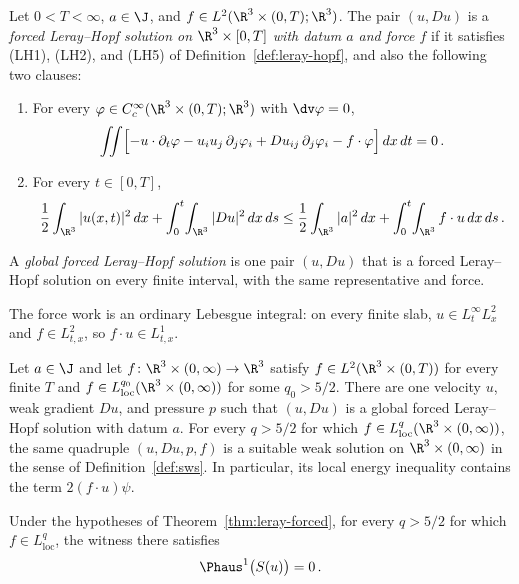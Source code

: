 \documentclass[11pt,reqno]{amsart}
\begin{document}
\begin{definition}\label{def:forced-leray-hopf}
Let $0<T<\infty$, $a\in\J$, and
$f\in L^2(\R^3\times(0,T);\R^3)$. The pair $(u,Du)$ is a
\emph{forced Leray--Hopf solution on $\R^3\times[0,T]$ with datum $a$ and
force $f$} if it satisfies (LH1), (LH2), and (LH5) of
Definition~\ref{def:leray-hopf}, and also the following two clauses:
\begin{enumerate}[label=(FLH\arabic*)]
\item For every $\varphi\in C_c^\infty(\R^3\times(0,T);\R^3)$ with
  $\dv\varphi=0$,
  \[
  \iint\Bigl[-u\cdot\partial_t\varphi-u_i u_j\,\partial_j\varphi_i
       +Du_{ij}\,\partial_j\varphi_i-f\cdot\varphi\Bigr]\,dx\,dt=0\,.
  \]
\item For every $t\in[0,T]$,
  \[
  \frac12\int_{\R^3}|u(x,t)|^2\,dx
  +\int_0^t\!\int_{\R^3}|Du|^2\,dx\,ds
  \le\frac12\int_{\R^3}|a|^2\,dx
  +\int_0^t\!\int_{\R^3}f\cdot u\,dx\,ds\,.
  \]
\end{enumerate}
A \emph{global forced Leray--Hopf solution} is one pair $(u,Du)$ that is
a forced Leray--Hopf solution on every finite interval, with the same
representative and force.
\end{definition}

The force work is an ordinary Lebesgue integral: on every finite slab,
$u\in L^\infty_tL^2_x$ and $f\in L^2_{t,x}$, so $f\cdot u\in L^1_{t,x}$.

\begin{theorem}\label{thm:leray-forced}
Let $a\in\J$ and let $f\colon\R^3\times(0,\infty)\to\R^3$ satisfy
$f\in L^2(\R^3\times(0,T))$ for every finite $T$ and
$f\in L^{q_0}_{\mathrm{loc}}(\R^3\times(0,\infty))$ for some
$q_0>5/2$. There are one velocity $u$, weak gradient $Du$, and pressure
$p$ such that $(u,Du)$ is a global forced Leray--Hopf solution with datum
$a$. For every $q>5/2$ for which
$f\in L^q_{\mathrm{loc}}(\R^3\times(0,\infty))$, the same quadruple
$(u,Du,p,f)$ is a suitable weak solution on
$\R^3\times(0,\infty)$ in the sense of
Definition~\ref{def:sws}. In particular, its local energy inequality
contains the term $2(f\cdot u)\psi$.
\end{theorem}

\begin{theorem}
\label{thm:leray-forced-singularSet}
Under the hypotheses of Theorem~\ref{thm:leray-forced}, for every
$q>5/2$ for which $f\in L^q_{\mathrm{loc}}$, the witness there satisfies
\[
 \Phaus^{1}\bigl(S(u)\bigr)=0\,.
\]
\end{theorem}
\end{document}

